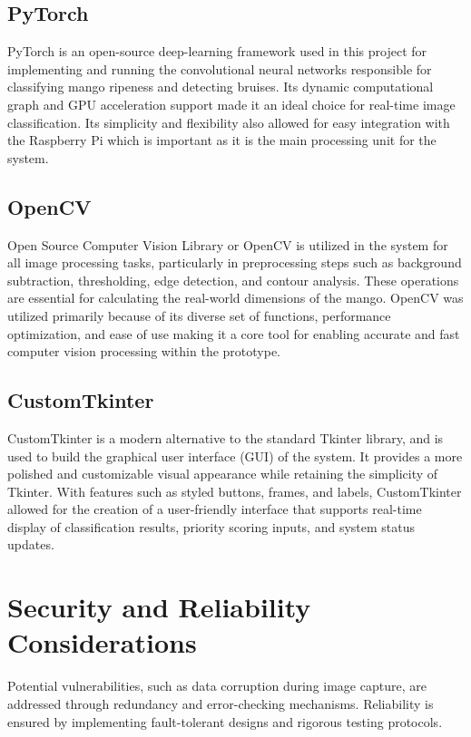 \subsection{PyTorch}

PyTorch is an open-source deep-learning framework used in this project for
implementing and running the convolutional neural networks responsible for
classifying mango ripeness and detecting bruises. Its dynamic computational
graph and GPU acceleration support made it an ideal choice for real-time image
classification. Its simplicity and flexibility also allowed for easy integration
with the Raspberry Pi which is important as it is the main processing unit for
the system.

\subsection{OpenCV}
Open Source Computer Vision Library or OpenCV is utilized in the system for all
image processing tasks, particularly in preprocessing steps such as background
subtraction, thresholding, edge detection, and contour analysis. These
operations are essential for calculating the real-world dimensions of the mango.
OpenCV was utilized primarily because of its diverse set of functions,
performance optimization, and ease of use making it a core tool for enabling
accurate and fast computer vision processing within the prototype.

\subsection{CustomTkinter}
CustomTkinter is a modern alternative to the standard Tkinter library, and is
used to build the graphical user interface (GUI) of the system. It provides a
more polished and customizable visual appearance while retaining the simplicity
of Tkinter. With features such as styled buttons, frames, and labels,
CustomTkinter allowed for the creation of a user-friendly interface that
supports real-time display of classification results, priority scoring inputs,
and system status updates.

\section{Security and Reliability Considerations}
Potential vulnerabilities, such as data corruption during image capture, are addressed through redundancy and error-checking mechanisms. Reliability is ensured by implementing fault-tolerant designs and rigorous testing protocols.

